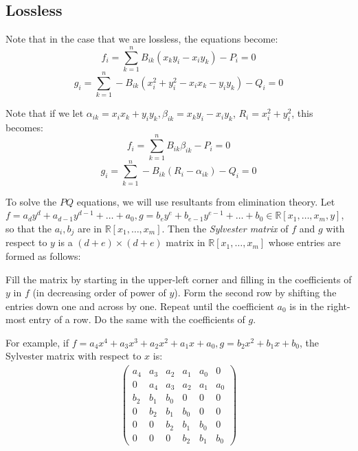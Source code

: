\documentclass[10pt, a4paper, twoside]{article}
\theoremstyle{plain}
\numberwithin{equation}{section}
\theoremstyle{definition}
\theoremstyle{remark}
\newcommand{\real}{\mathbb{R}}
\begin{document}
\subsection{Lossless}

Note that in the case that we are lossless, the equations become:
\begin{equation}
f_i = \sum_{k=1}^n B_{ik}(x_ky_i-x_iy_k)-P_i=0
\end{equation}
\begin{equation}
g_i = \sum_{k=1}^n -B_{ik}(x_i^2+y_i^2-x_ix_k-y_iy_k)-Q_i=0
\end{equation}

Note that if we let $\alpha_{ik} = x_ix_k+y_iy_k, \beta_{ik} = x_ky_i-x_iy_k$, $R_i = x_i^2+y_i^2$, this becomes:
\begin{equation}
f_i = \sum_{k=1}^n B_{ik}\beta_{ik}-P_i = 0
\end{equation}
\begin{equation}
g_i = \sum_{k=1}^n -B_{ik}(R_i-\alpha_{ik}) - Q_i =0
\end{equation}

To solve the $PQ$ equations, we will use resultants from elimination theory. Let $f = a_dy^d + a_{d-1}y^{d-1} + \ldots + a_0, g = b_ey^e+b_{e-1}y^{e-1}+\ldots+b_0 \in \real[x_1,\ldots, x_m,y]$, so that the $a_i, b_j$ are in $\real[x_1,\ldots, x_m]$. Then the {\it Sylvester matrix} of $f$ and $g$ with respect to $y$ is a $(d+e)\times(d+e)$ matrix in $\real[x_1,\ldots, x_m]$ whose entries are formed as follows:

Fill the matrix by starting in the upper-left corner and filling in the coefficients of $y$ in $f$ (in decreasing order of power of $y$). Form the second row by shifting the entries down one and across by one. Repeat until the coefficient $a_0$ is in the right-most entry of a row. Do the same with the coefficients of $g$.

For example, if $f = a_4x^4+a_3x^3+a_2x^2+a_1x+a_0, g = b_2x^2+b_1x+b_0$, the Sylvester matrix with respect to $x$ is:
\begin{align*}
\begin{pmatrix}
a_4 & a_3 & a_2 & a_1 & a_0 & 0\\
0 & a_4 & a_3 & a_2 & a_1 & a_0\\
b_2 & b_1 & b_0 & 0 & 0 & 0\\
0 & b_2 & b_1 & b_0 & 0 & 0\\
0 & 0 & b_2 & b_1 & b_0 & 0\\
0 & 0 & 0 & b_2 & b_1 & b_0\end{pmatrix}
\end{align*}
\end{document}

